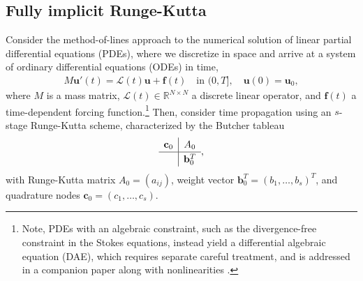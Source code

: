 \documentclass[a4paper,10pt]{article}
\begin{document}
\subsection{Fully implicit Runge-Kutta}\label{sec:intro:irk}

Consider the method-of-lines approach to the numerical solution of linear
partial differential equations (PDEs), where we discretize in space and arrive
at a system of ordinary differential equations (ODEs) in time,
%
\begin{align*}
M\mathbf{u}'(t) =  \mathcal{L}(t)\mathbf{u} + \mathbf{f}(t)
	\quad\text{in }(0,T], \quad \mathbf{u}(0) = \mathbf{u}_0,
\end{align*}
%
where $M$ is a mass matrix, $\mathcal{L}(t)\in\mathbb{R}^{N\times N}$ a discrete
linear operator, and $\mathbf{f}(t)$ a time-dependent forcing
function.\footnote{Note,
PDEs with an algebraic constraint, such as the divergence-free
constraint in the Stokes equations, instead yield a differential algebraic equation (DAE), which
requires separate careful treatment, and is addressed in a companion paper along with
nonlinearities \cite{irk2}.}
Then, consider time propagation using an $s$-stage Runge-Kutta scheme,
characterized by the Butcher tableau
%
\begin{align*}
	\renewcommand\arraystretch{1.2}
	\begin{array}
	{c|c}
	\mathbf{c}_0 & A_0\\
	\hline
	& \mathbf{b}_0^T
	\end{array},
\end{align*}
%
with Runge-Kutta matrix $A_0 = (a_{ij})$, weight vector $\mathbf{b}_0^T = (b_1,
\ldots, b_s)^T$, and quadrature nodes $\mathbf{c}_0 = (c_1, \ldots, c_s)$.
\end{document}
